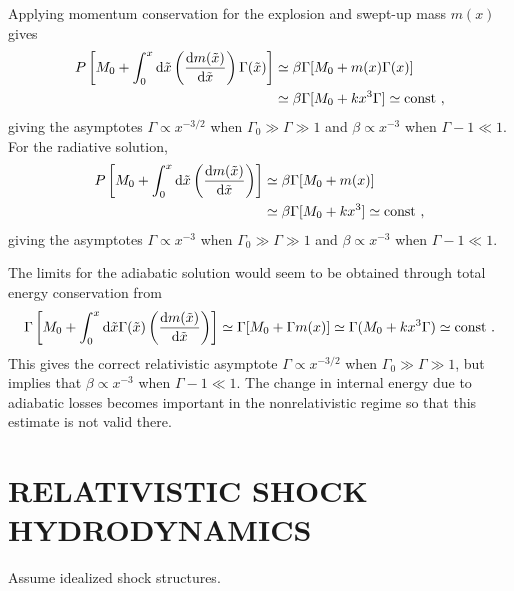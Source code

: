 \documentclass[12pt,a4paper]{article}
\newcommand{\dif}{\mathrm{d}}
\begin{document}
Applying momentum conservation for the explosion and swept-up mass $m(x)$ gives
\begin{align}
\nonumber P\left[M_0 +\int_0^x \dif \tilde{x} \left(\dfrac{\dif m(\tilde{x})}{\dif \tilde{x}} \right) \Gamma(\tilde{x}) \right] & \simeq \beta \Gamma [M_0 +m(x) \Gamma(x)] \\
& \simeq \beta \Gamma [M_0 +kx^3 \Gamma] \simeq \rm const ~,
\end{align}
giving the asymptotes $\Gamma \propto x^{-3/2}$ when $\Gamma_0 \gg \Gamma \gg 1$ and $\beta \propto x^{-3}$ when $\Gamma -1 \ll 1$. For the radiative solution,
\begin{align}
\nonumber P\left[M_0 +\int_0^x \dif \tilde{x} \left(\dfrac{\dif m(\tilde{x})}{\dif \tilde{x}} \right) \right] & \simeq \beta \Gamma [M_0 +m(x) ] \\
& \simeq \beta \Gamma [M_0 +kx^3 ] \simeq \rm const ~,
\end{align}
giving the asymptotes $\Gamma \propto x^{-3}$ when $\Gamma_0 \gg \Gamma \gg 1$ and $\beta \propto x^{-3}$ when $\Gamma -1 \ll 1$.

The limits for the adiabatic solution would seem to be obtained through total energy conservation from
\begin{align}
\Gamma \left[M_0 +\int_0^x \dif \tilde{x} \Gamma(\tilde{x}) \left(\dfrac{\dif m(\tilde{x})}{\dif \tilde{x}} \right) \right] \simeq \Gamma [M_0 +\Gamma m(x) ] \simeq \Gamma(M_0 +kx^3 \Gamma) \simeq \rm const ~.
\end{align}
This gives the correct relativistic asymptote $\Gamma \propto x^{-3/2}$ when $\Gamma_0 \gg \Gamma \gg 1$, but implies that $\beta \propto x^{-3}$ when $\Gamma -1 \ll 1$. The change in internal energy due to adiabatic losses becomes important in the nonrelativistic regime so that this estimate is not valid there.









\section{RELATIVISTIC SHOCK HYDRODYNAMICS}
\cite{2009herb.book.....D} Assume idealized shock structures. 
\end{document}
